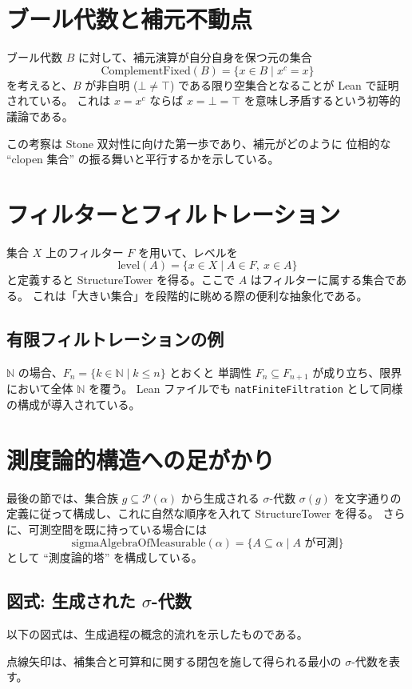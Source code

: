 \documentclass[a4paper]{ltjsarticle}
\begin{document}
\section{ブール代数と補元不動点}

ブール代数 $B$ に対して、補元演算が自分自身を保つ元の集合
\[
  \mathrm{ComplementFixed}(B) = \{x \in B \mid x^c = x\}
\]
を考えると、$B$ が非自明 ($\bot \neq \top$) である限り空集合となることが Lean で証明されている。
これは $x = x^c$ ならば $x = \bot = \top$ を意味し矛盾するという初等的議論である。

この考察は Stone 双対性に向けた第一歩であり、補元がどのように
位相的な ``clopen 集合'' の振る舞いと平行するかを示している。

\section{フィルターとフィルトレーション}

集合 $X$ 上のフィルター $F$ を用いて、レベルを
\[
  \mathrm{level}(A) = \{x \in X \mid A \in F,\ x \in A\}
\]
と定義すると StructureTower を得る。ここで $A$ はフィルターに属する集合である。
これは「大きい集合」を段階的に眺める際の便利な抽象化である。

\subsection*{有限フィルトレーションの例}
$\mathbb{N}$ の場合、$F_n = \{k \in \mathbb{N} \mid k \le n\}$ とおくと
単調性 $F_n \subseteq F_{n+1}$ が成り立ち、限界において全体 $\mathbb{N}$ を覆う。
Lean ファイルでも \texttt{natFiniteFiltration} として同様の構成が導入されている。

\section{測度論的構造への足がかり}

最後の節では、集合族 $g \subseteq \mathcal{P}(\alpha)$ から生成される $\sigma$-代数
$\sigma(g)$ を文字通りの定義に従って構成し、これに自然な順序を入れて StructureTower を得る。
さらに、可測空間を既に持っている場合には
\[
  \mathrm{sigmaAlgebraOfMeasurable}(\alpha) = \{A \subseteq \alpha \mid A \text{ が可測}\}
\]
として ``測度論的塔'' を構成している。

\subsection*{図式: 生成された $\sigma$-代数}
以下の図式は、生成過程の概念的流れを示したものである。
\begin{center}
\end{center}
点線矢印は、補集合と可算和に関する閉包を施して得られる最小の $\sigma$-代数を表す。
\end{document}
